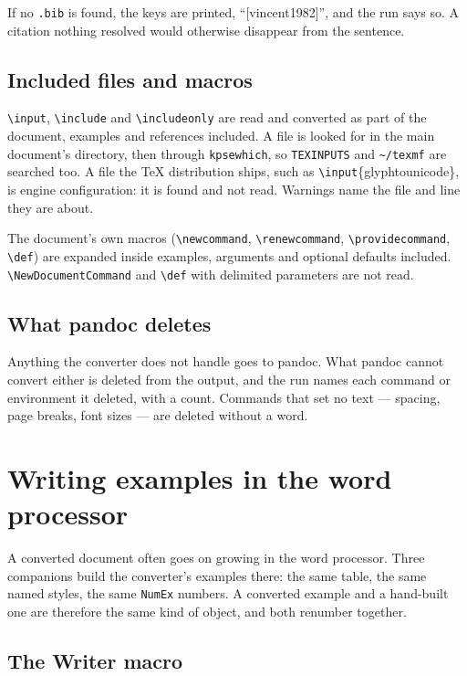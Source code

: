 \documentclass[11pt,a4paper]{article}
\newcommand{\cs}[1]{\texttt{\textbackslash #1}}
\newcommand{\file}[1]{\texttt{#1}}
\begin{document}
If no \file{.bib} is found, the keys are printed, ``[vincent1982]'', and the
run says so. A citation nothing resolved would otherwise disappear from the
sentence.

\subsection{Included files and macros}

\cs{input}, \cs{include} and \cs{includeonly} are read and converted as part
of the document, examples and references included. A file is looked for in
the main document's directory, then through \texttt{kpsewhich}, so
\texttt{TEXINPUTS} and \file{\textasciitilde/texmf} are searched too. A file
the \TeX{} distribution ships, such as \cs{input}\{glyphtounicode\}, is engine
configuration: it is found and not read. Warnings name the file and line they
are about.

The document's own macros (\cs{newcommand}, \cs{renewcommand},
\cs{providecommand}, \cs{def}) are expanded inside examples, arguments and
optional defaults included. \cs{NewDocumentCommand} and \cs{def} with
delimited parameters are not read.

\subsection{What pandoc deletes}

Anything the converter does not handle goes to pandoc. What pandoc cannot
convert either is deleted from the output, and the run names each command or
environment it deleted, with a count. Commands that set no text --- spacing,
page breaks, font sizes --- are deleted without a word.

\section{Writing examples in the word processor}\label{sec:inside}

A converted document often goes on growing in the word processor. Three
companions build the converter's examples there: the same table, the same
named styles, the same \texttt{NumEx} numbers. A converted example and a
hand-built one are therefore the same kind of object, and both renumber
together.

\subsection{The Writer macro}
\end{document}
